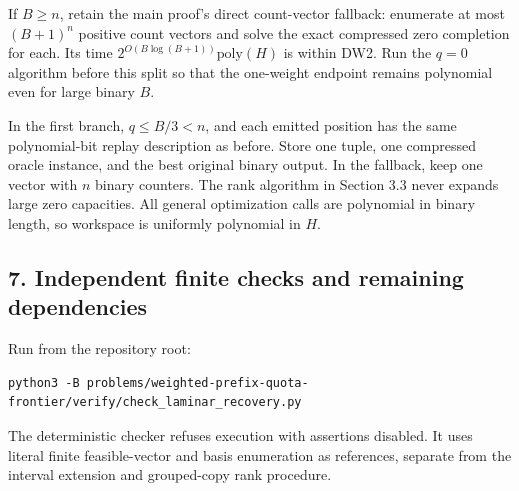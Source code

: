 If \(B\ge n\), retain the main proof's direct count-vector fallback: enumerate at most \((B+1)^n\) positive count vectors and solve the exact compressed zero completion for each. Its time \(2^{O(B\log(B+1))}\mathrm{poly}(H)\) is within DW2. Run the \(q=0\) algorithm before this split so that the one-weight endpoint remains polynomial even for large binary \(B\).

In the first branch, \(q\le B/3<n\), and each emitted position has the same polynomial-bit replay description as before. Store one tuple, one compressed oracle instance, and the best original binary output. In the fallback, keep one vector with \(n\) binary counters. The rank algorithm in Section 3.3 never expands large zero capacities. All general optimization calls are polynomial in binary length, so workspace is uniformly polynomial in \(H\).

\hypertarget{af-fe230a140d-independent-finite-checks-and-remaining-dependencies}{%
\subsection{7. Independent finite checks and remaining dependencies}\label{af-fe230a140d-independent-finite-checks-and-remaining-dependencies}}

Run from the repository root:

\begin{verbatim}
python3 -B problems/weighted-prefix-quota-frontier/verify/check_laminar_recovery.py
\end{verbatim}

The deterministic checker refuses execution with assertions disabled. It uses literal finite feasible-vector and basis enumeration as references, separate from the interval extension and grouped-copy rank procedure.

